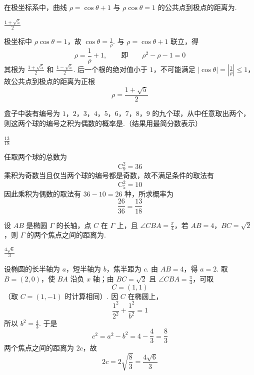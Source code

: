 \begin{problem}
在极坐标系中，曲线 \(\rho=\cos\theta+1\) 与 \(\rho\cos\theta=1\) 的公共点到极点的距离为\fillinblank{}.
\begin{answer}
\(\frac{1+\sqrt{5}}{2}\)
\end{answer}

\begin{solution}
极坐标中 \(\rho\cos\theta=1\)，故 \(\cos\theta=\frac{1}{\rho}\). 与 \(\rho=\cos\theta+1\) 联立，得
\[
\rho=\frac{1}{\rho}+1,
\qquad\text{即}\qquad
\rho^2-\rho-1=0
\]
其根为 \(\frac{1+\sqrt5}{2}\) 和 \(\frac{1-\sqrt5}{2}\). 后一个根的绝对值小于 \(1\)，不可能满足 \(\left|\cos\theta\right|=\left|\frac{1}{\rho}\right|\leqslant1\)，故公共点到极点的距离为正根
\[
\rho=\frac{1+\sqrt5}{2}
\]
\end{solution}
\end{problem}

\begin{problem}
盒子中装有编号为 \(1\)，\(2\)，\(3\)，\(4\)，\(5\)，\(6\)，\(7\)，\(8\)，\(9\) 的九个球，从中任意取出两个，则这两个球的编号之积为偶数的概率是\fillinblank{}.（结果用最简分数表示）
\begin{answer}
\(\frac{13}{18}\)
\end{answer}

\begin{solution}
任取两个球的总数为
\[
\mathrm C_9^2=36
\]
乘积为奇数当且仅当两个球的编号都是奇数，故不满足条件的取法有
\[
\mathrm C_5^2=10
\]
因此乘积为偶数的取法有 \(36-10=26\) 种，所求概率为
\[
\frac{26}{36}=\frac{13}{18}
\]
\end{solution}
\end{problem}

\begin{problem}
设 \(AB\) 是椭圆 \(\Gamma\) 的长轴，点 \(C\) 在 \(\Gamma\) 上，且 \(\angle CBA=\frac{\pi}{4}\)，若 \(AB=4\)，\(BC=\sqrt{2}\)，则 \(\Gamma\) 的两个焦点之间的距离为\fillinblank{}.
\begin{answer}
\(\frac{4\sqrt{6}}{3}\)
\end{answer}

\begin{solution}
设椭圆的长半轴为 \(a\)，短半轴为 \(b\)，焦半距为 \(c\). 由 \(AB=4\)，得 \(a=2\). 取 \(B=(2,0)\)，使 \(BA\) 沿负 \(x\) 轴；由 \(BC=\sqrt2\) 且 \(\angle CBA=\frac{\pi}{4}\)，可取
\[
C=(1,1)
\]
（取 \(C=(1,-1)\) 时计算相同）. 因 \(C\) 在椭圆上，
\[
\frac{1^2}{2^2}+\frac{1^2}{b^2}=1
\]
所以 \(b^2=\frac{4}{3}\). 于是
\[
c^2=a^2-b^2=4-\frac{4}{3}=\frac{8}{3}
\]
两个焦点之间的距离为 \(2c\)，故
\[
2c=2\sqrt{\frac{8}{3}}=\frac{4\sqrt6}{3}
\]
\end{solution}
\end{problem}

